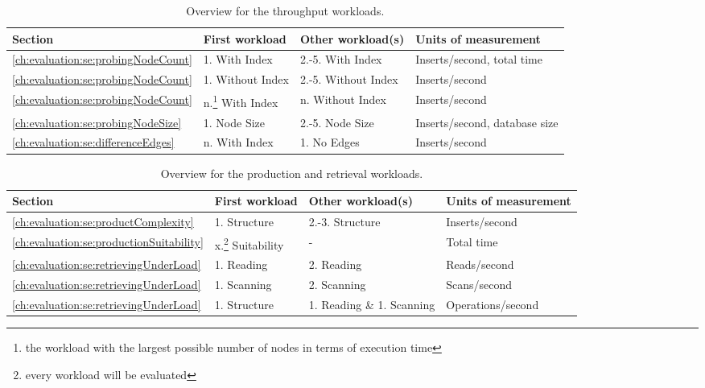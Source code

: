 \begin{table}
  \begin{minipage}{\textwidth}
    \centering
    \begin{tabularx}{\textwidth}{ | l | l | l | X | }
      \hline
      Section & First workload & Other workload(s) & Units of measurement \\ \hline
      \ref{ch:evaluation:se:probingNodeCount} & 1. With Index & 2.-5. With Index & Inserts/second, total time \\ \hline
      \ref{ch:evaluation:se:probingNodeCount} & 1. Without Index & 2.-5. Without Index & Inserts/second \\ \hline
      \ref{ch:evaluation:se:probingNodeCount} & n.\footnote{the workload with the largest possible number of nodes in terms of execution time} With Index & n. Without Index & Inserts/second \\ \hline
      \ref{ch:evaluation:se:probingNodeSize} & 1. Node Size & 2.-5. Node Size & Inserts/second, database size \\ \hline
      \ref{ch:evaluation:se:differenceEdges} & n. With Index & 1. No Edges & Inserts/second \\ \hline
    \end{tabularx}
  \end{minipage}
  \caption{Overview for the throughput workloads.}
  \label{tab:throughputOverview}
\end{table}
\begin{table}
  \begin{minipage}{\textwidth}
    \centering
    \begin{tabularx}{\textwidth}{ | l | l | X | X | }
      \hline
      Section & First workload & Other workload(s) & Units of measurement \\ \hline
      \ref{ch:evaluation:se:productComplexity} & 1. Structure & 2.-3. Structure & Inserts/second \\ \hline
      \ref{ch:evaluation:se:productionSuitability} & x.\footnote{every workload will be evaluated} Suitability & - & Total time \\ \hline
      \ref{ch:evaluation:se:retrievingUnderLoad} & 1. Reading & 2. Reading & Reads/second \\ \hline
      \ref{ch:evaluation:se:retrievingUnderLoad} & 1. Scanning & 2. Scanning & Scans/second \\ \hline
      \ref{ch:evaluation:se:retrievingUnderLoad} & 1. Structure & 1. Reading \& 1. Scanning & Operations/second \\ \hline
    \end{tabularx}
  \end{minipage}
  \caption{Overview for the production and retrieval workloads.}
  \label{tab:productionOverview}
\end{table}

